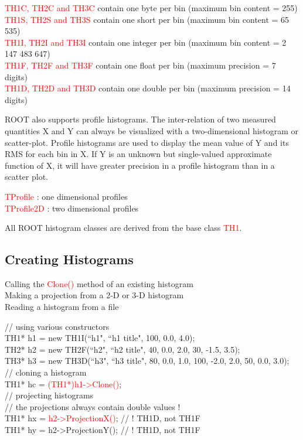 \documentclass[12pt,a4paper]{article}
\begin{document}
\textcolor{red}{TH1C, TH2C and TH3C} contain one byte per bin (maximum bin content = 255) \\
\textcolor{red}{TH1S, TH2S and TH3S} contain one short per bin (maximum bin content = 65 535) \\
\textcolor{red}{TH1I, TH2I and TH3I} contain one integer per bin (maximum bin content = 2 147 483 647) \\
\textcolor{red}{TH1F, TH2F and TH3F} contain one float per bin (maximum precision = 7 digits) \\
\textcolor{red}{TH1D, TH2D and TH3D} contain one double per bin (maximum precision = 14 digits)

ROOT also supports profile histograms. The inter-relation of two measured quantities X and Y can always be visualized with a two-dimensional histogram or scatter-plot. Profile histograms are used to display the mean value of Y and its RMS for each bin in X. If Y is an unknown but single-valued approximate function of X, it will have greater precision in a profile histogram than in a scatter plot.

\textcolor{red}{TProfile} : one dimensional profiles \\
\textcolor{red}{TProfile2D} : two dimensional profiles

All ROOT histogram classes are derived from the base class \textcolor{red}{TH1}.

\subsection{Creating Histograms}

Calling the \textcolor{red}{Clone()} method of an existing histogram \\
Making a projection from a 2-D or 3-D histogram \\
Reading a histogram from a file

// using various constructors \\
TH1* h1 = new TH1I(``h1", ``h1 title", 100, 0.0, 4.0); \\
TH2* h2 = new TH2F(``h2", ``h2 title", 40, 0.0, 2.0, 30, -1.5, 3.5); \\
TH3* h3 = new TH3D(``h3", ``h3 title", 80, 0.0, 1.0, 100, -2.0, 2.0, 50, 0.0, 3.0); \\
// cloning a histogram \\
TH1* hc = \textcolor{red}{(TH1*)h1->Clone()}; \\
// projecting histograms \\
// the projections always contain double values ! \\
TH1* hx = \textcolor{red}{h2->ProjectionX()}; // ! TH1D, not TH1F \\
TH1* hy = h2->ProjectionY(); // ! TH1D, not TH1F
\end{document}
